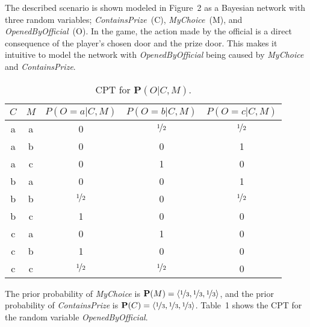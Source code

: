 \begin{sloppypar}
The described scenario is shown modeled in Figure~2 as a Bayesian network with three random variables; \textit{ContainsPrize}~(C), \textit{MyChoice}~(M), and \textit{OpenedByOfficial}~(O). In the game, the action made by the official is a direct consequence of the player's chosen door and the prize door. This makes it intuitive to model the network with \textit{OpenedByOfficial} being caused by \textit{MyChoice} and \textit{ContainsPrize}.
\end{sloppypar}

\begin{table}
\centering
\begin{tabular}{ccccc}
\toprule
$C$ & $M$ & $P(O=a \vert C, M)$ & $P(O=b \vert C, M)$ & $P(O=c \vert C, M)$ \\
\midrule
a   & a   & 0                   & $\nicefrac{1}{2}$   & $\nicefrac{1}{2}$   \\
a   & b   & 0                   & 0                   & 1                   \\
a   & c   & 0                   & 1                   & 0                   \\
b   & a   & 0                   & 0                   & 1                   \\
b   & b   & $\nicefrac{1}{2}$   & 0                   & $\nicefrac{1}{2}$   \\
b   & c   & 1                   & 0                   & 0                   \\
c   & a   & 0                   & 1                   & 0                   \\
c   & b   & 1                   & 0                   & 0                   \\
c   & c   & $\nicefrac{1}{2}$   & $\nicefrac{1}{2}$   & 0                   \\
\bottomrule
\end{tabular}
\label{table:p3_o_cpt}
\caption{\acf{CPT} for $\textbf{P}(O \vert C, M)$.}
\end{table}

\begin{sloppypar}
The prior probability of \textit{MyChoice} is $\textbf{P}(M) = \langle \nicefrac{1}{3}, \nicefrac{1}{3}, \nicefrac{1}{3} \rangle$, and the prior probability of \textit{ContainsPrize} is $\textbf{P}(C) = \langle \nicefrac{1}{3}, \nicefrac{1}{3}, \nicefrac{1}{3} \rangle$. Table~1 shows the \ac{CPT} for the random variable \textit{OpenedByOfficial}.
\end{sloppypar}

